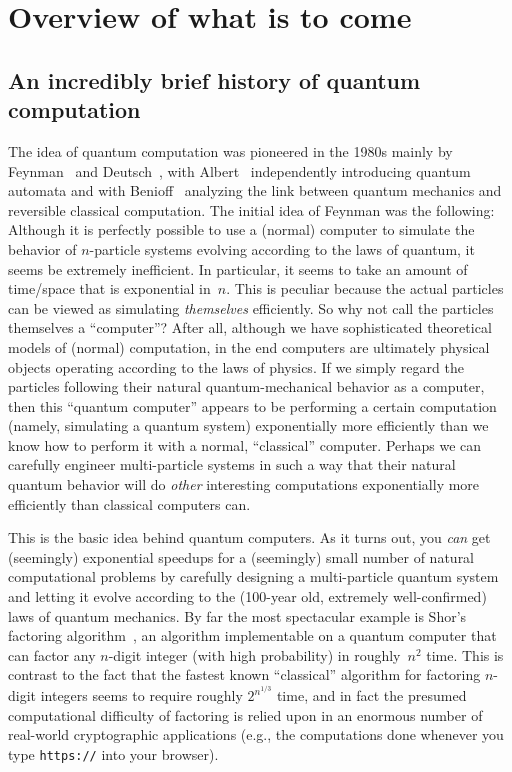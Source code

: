 \documentclass[12pt]{article}
\begin{document}
\MakeScribeTop

\section{Overview of what is to come}

\subsection{An incredibly brief history of quantum computation}

The idea of quantum computation was pioneered in the 1980s mainly by Feynman~\cite{Fey82,Fey86} and Deutsch~\cite{Deu85,Deu89}, with Albert~\cite{Alb83} independently introducing quantum automata and with Benioff~\cite{Ben80} analyzing the link between quantum mechanics and reversible classical computation.  The initial idea of Feynman was the following: Although it is perfectly possible to use a (normal) computer to simulate the behavior of $n$-particle systems evolving according to the laws of quantum, it seems be extremely inefficient.  In particular, it seems to take an amount of time/space that is exponential in~$n$.  This is peculiar because the actual particles can be viewed as simulating \emph{themselves} efficiently. So why not call the particles themselves a ``computer''?  After all, although we have sophisticated theoretical models of (normal) computation, in the end computers are ultimately physical objects operating according to the laws of physics.  If we simply regard the particles following their natural quantum-mechanical behavior as a computer, then this ``quantum computer'' appears to be performing a certain computation (namely, simulating a quantum system) exponentially more efficiently than we know how to perform it with a normal, ``classical'' computer.  Perhaps we can carefully engineer multi-particle systems in such a way that their natural quantum behavior will do \emph{other} interesting computations exponentially more efficiently than classical computers can.

This is the basic idea behind quantum computers.  As it turns out, you \emph{can} get (seemingly) exponential speedups for a (seemingly) small number of natural computational problems by carefully designing a multi-particle quantum system and letting it evolve according to the (100-year old, extremely well-confirmed) laws of quantum mechanics.  By far the most spectacular example is Shor's factoring algorithm~\cite{Sho97}, an algorithm implementable on a quantum computer that can factor any $n$-digit integer (with high probability) in roughly~$n^2$ time.  This is contrast to the fact that the fastest known ``classical'' algorithm for factoring $n$-digit integers seems to require roughly $2^{n^{1/3}}$ time, and in fact the presumed computational difficulty of factoring is relied upon in an enormous number of real-world cryptographic applications (e.g., the computations done whenever you type \texttt{https://} into your browser).
\end{document}
